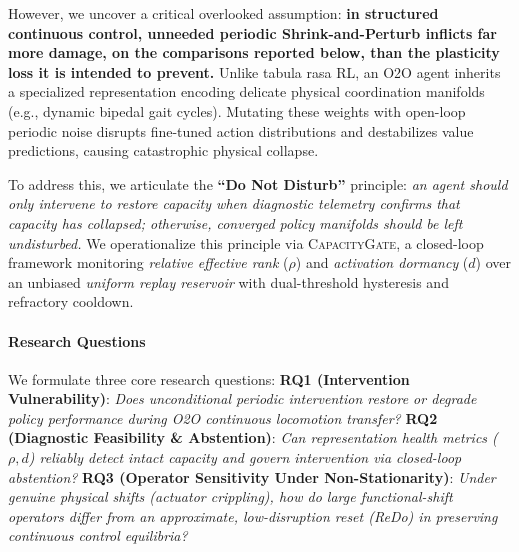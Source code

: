 \documentclass{article}
\begin{document}
However, we uncover a critical overlooked assumption: \textbf{in structured continuous control, unneeded periodic Shrink-and-Perturb inflicts far more damage, on the comparisons reported below, than the plasticity loss it is intended to prevent.} Unlike tabula rasa RL, an O2O agent inherits a specialized representation encoding delicate physical coordination manifolds (e.g., dynamic bipedal gait cycles). Mutating these weights with open-loop periodic noise disrupts fine-tuned action distributions and destabilizes value predictions, causing catastrophic physical collapse.

To address this, we articulate the \textbf{``Do Not Disturb''} principle: \emph{an agent should only intervene to restore capacity when diagnostic telemetry confirms that capacity has collapsed; otherwise, converged policy manifolds should be left undisturbed.} We operationalize this principle via \textsc{CapacityGate}, a closed-loop framework monitoring \emph{relative effective rank} ($\rho$) and \emph{activation dormancy} ($d$) over an unbiased \emph{uniform replay reservoir} with dual-threshold hysteresis and refractory cooldown.

\paragraph{Research Questions}
We formulate three core research questions:
\textbf{RQ1 (Intervention Vulnerability)}: \emph{Does unconditional periodic intervention restore or degrade policy performance during O2O continuous locomotion transfer?}
\textbf{RQ2 (Diagnostic Feasibility \& Abstention)}: \emph{Can representation health metrics ($\rho, d$) reliably detect intact capacity and govern intervention via closed-loop abstention?}
\textbf{RQ3 (Operator Sensitivity Under Non-Stationarity)}: \emph{Under genuine physical shifts (actuator crippling), how do large functional-shift operators differ from an approximate, low-disruption reset (ReDo) in preserving continuous control equilibria?}
\end{document}
